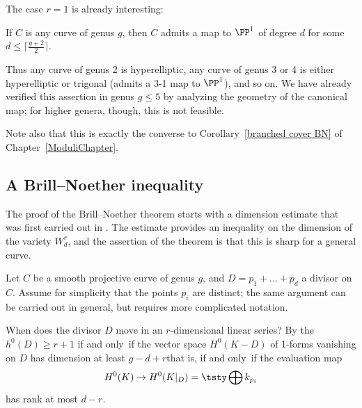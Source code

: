 The case $r=1$ is already interesting:

\begin{corollary}
If $C$ is any curve of genus $g$, then $C$ admits a map  to $\PP^1$
of degree $d$ for some $d \leq \bigl\lceil \frac{g+2}{2}\bigr\rceil$.
\end{corollary}

Thus any curve of genus 2 is hyperelliptic, any curve of genus 3 or
4 is either hyperelliptic or trigonal  (admits a 3-1 map to $\PP^1$),
and so on. We have already verified this assertion in genus $g \leq 5$
by analyzing the geometry of the canonical map; for higher genera,
though, this is not feasible.

Note also that this is exactly the converse to Corollary~\ref{branched
cover BN} of Chapter~\ref{ModuliChapter}.


\subsection{A Brill--Noether inequality}\label{BN by divisors}

The proof of the Brill--Noether theorem starts with a dimension
estimate that was first carried out in
\cite{Brill-NoetherOriginal}. The estimate provides an inequality on
the dimension of the variety $W^r_d$, and the assertion of the theorem
is that this is sharp for a general curve.


Let $C$ be a smooth projective curve of genus $g$, and $D = p_1 + \dots
+ p_d$ a divisor on $C$. Assume for simplicity that  the points $p_i$
are distinct; the same argument  can be carried out in general, but
requires more complicated notation.

When does the divisor $D$ move in an $r$-dimensional linear series? By
the 
%
$h^0(D) \geq r+1$ if and only~if the vector
space $H^0(K-D)$ of 1-forms vanishing on $D$ has dimension at least
$g-d+r$\emdash that is, if and only~if the  evaluation map
$$
H^0(K) \to H^0(K|_D) = \tsty\bigoplus k_{p_i}
$$
has rank at most $d-r$.

